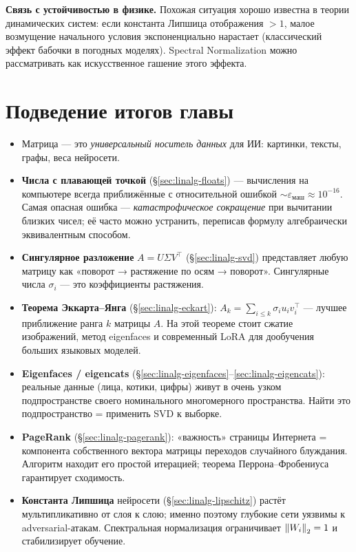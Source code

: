 \begin{interestbox}
\textbf{Связь с устойчивостью в физике.} Похожая ситуация хорошо
известна в теории динамических систем: если константа Липшица
отображения $> 1$, малое возмущение начального условия экспоненциально
нарастает (классический эффект бабочки в погодных моделях).
Spectral Normalization можно рассматривать как искусственное
гашение этого эффекта.
\end{interestbox}

\section*{Подведение итогов главы}

\begin{itemize}\itemsep1pt
  \item Матрица — это \emph{универсальный носитель данных} для ИИ:
        картинки, тексты, графы, веса нейросети.
  \item \textbf{Числа с плавающей точкой} (§\ref{sec:linalg-floats}) —
        вычисления на компьютере всегда приближённые с относительной
        ошибкой $\sim\varepsilon_{\text{маш}}\approx 10^{-16}$.
        Самая опасная ошибка — \emph{катастрофическое сокращение} при
        вычитании близких чисел; её часто можно устранить, переписав
        формулу алгебраически эквивалентным способом.
  \item \textbf{Сингулярное разложение} $A=U\Sigma V^{\!\top}$
        (§\ref{sec:linalg-svd}) представляет любую матрицу как
        «поворот → растяжение по осям → поворот». Сингулярные числа
        $\sigma_i$ — это коэффициенты растяжения.
  \item \textbf{Теорема Эккарта--Янга} (§\ref{sec:linalg-eckart}):
        $A_k=\sum_{i\leq k}\sigma_i u_i v_i^{\!\top}$ — лучшее
        приближение ранга $k$ матрицы $A$. На этой теореме
        стоит сжатие изображений, метод eigenfaces и современный
        LoRA для дообучения больших языковых моделей.
  \item \textbf{Eigenfaces / eigencats}
        (§\ref{sec:linalg-eigenfaces}--\ref{sec:linalg-eigencats}):
        реальные данные (лица, котики, цифры) живут в очень узком
        подпространстве своего номинального многомерного пространства.
        Найти это подпространство = применить SVD к выборке.
  \item \textbf{PageRank} (§\ref{sec:linalg-pagerank}): «важность»
        страницы Интернета = компонента собственного вектора матрицы
        переходов случайного блуждания. Алгоритм находит его простой
        итерацией; теорема Перрона--Фробениуса гарантирует сходимость.
  \item \textbf{Константа Липшица} нейросети
        (§\ref{sec:linalg-lipschitz}) растёт мультипликативно от
        слоя к слою; именно поэтому глубокие сети уязвимы к
        adversarial-атакам. Спектральная нормализация ограничивает
        $\left\|W_i\right\|_2=1$ и стабилизирует обучение.
\end{itemize}


